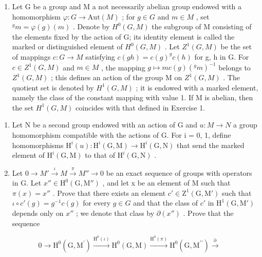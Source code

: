 \begin{enumerate}
\def\labelenumi{\arabic{enumi})}
\setcounter{enumi}{4}
\tightlist
\item
  Let G be a group and M a not necessarily abelian group endowed with a homomorphism \(\varphi: G \to \text{Aut}(M)\) ; for \(g \in G\) and \(m \in M\) , set \(^{g}m = \varphi(g)(m)\) . Denote by \(H^{0}(G, M)\) the subgroup of M consisting of the elements fixed by the action of G; its identity element is called the marked or distinguished element of \(H^{0}(G, M)\) . Let \(Z^{1}(G, M)\) be the set of mappings \(c: G \to M\) satisfying \(c(gh) = c(g)^{g}c(h)\) for g, h in G. For \(c \in Z^{1}(G, M)\) and \(m \in M\) , the mapping \(g \mapsto mc(g)(^g m)^{-1}\) belongs to \(Z^{1}(G, M)\) ; this defines an action of the group M on \(Z^{1}(G, M)\) . The quotient set is denoted by \(H^{1}(G, M)\) ; it is endowed with a marked element, namely the class of the constant mapping with value 1. If M is abelian, then the set \(H^{1}(G, M)\) coincides with that defined in Exercise 1.
\end{enumerate}

\begin{enumerate}
\def\labelenumi{\alph{enumi})}
\item
  Let N be a second group endowed with an action of G and \(u: M \to N\) a group homomorphism compatible with the actions of G. For i = 0, 1, define homomorphisms \(\mathrm{H}^{i}(u): \mathrm{H}^{i}(\mathrm{G}, \mathrm{M}) \to \mathrm{H}^{i}(\mathrm{G}, \mathrm{N})\) that send the marked element of \(\mathrm{H}^{i}(\mathrm{G}, \mathrm{M})\) to that of \(\mathrm{H}^{i}(\mathrm{G}, \mathrm{N})\) .
\item
  Let \(0 \to M' \xrightarrow{\iota} M \xrightarrow{\pi} M'' \to 0\) be an exact sequence of groups with operators in G. Let \(x'' \in \mathrm{H}^0(\mathrm{G}, \mathrm{M}'')\) , and let x be an element of M such that \(\pi(x) = x''\) . Prove that there exists an element \(c' \in \mathrm{Z}^1(\mathrm{G}, \mathrm{M}')\) such that \(\iota \circ c'(g) = g^{-1}c(g)\) for every \(g \in G\) and that the class of \(c'\) in \(\mathrm{H}^1(\mathrm{G}, \mathrm{M}')\) depends only on \(x''\) ; we denote that class by \(\partial(x'')\) . Prove that the sequence
\end{enumerate}

\[
0 \to \mathrm{H} ^ {0} (\mathrm{G}, \mathrm{M} ^ {\prime}) \xrightarrow {\mathrm{H} ^ {0} (\iota)} \mathrm{H} ^ {0} (\mathrm{G}, \mathrm{M}) \xrightarrow {\mathrm{H} ^ {0} (\pi)} \mathrm{H} ^ {0} (\mathrm{G}, \mathrm{M} ^ {\prime \prime}) \xrightarrow {\partial}
\]

